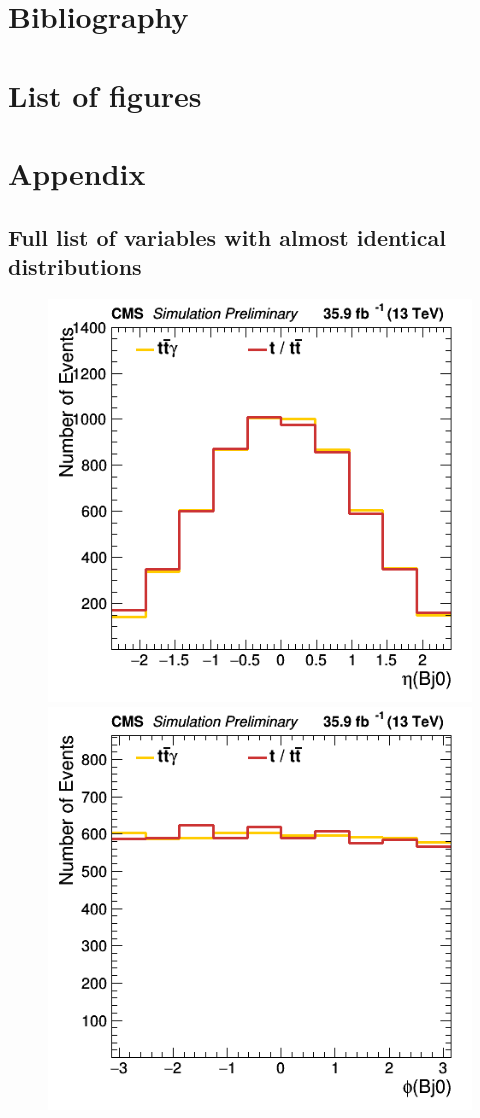 \documentclass[11pt]{scrartcl}
\begin{document}
\section{Bibliography}

\section{List of figures}

\section{Appendix}
	\subsection{Full list of variables with almost identical distributions}
	\label{sec:annex-identical}
	\begin{figure}[H]
	\centering
	\begin{minipage}{.5\textwidth}
	  \centering
	  \includegraphics[width=0.75\linewidth]{figures/Notused/Bj0_eta.png}
	\end{minipage}%
	\begin{minipage}{.5\textwidth}
	  \centering
	  \includegraphics[width=0.75\linewidth]{figures/Notused/Bj0_phi.png}
	\end{minipage}
	\end{figure}
	
\end{document}
